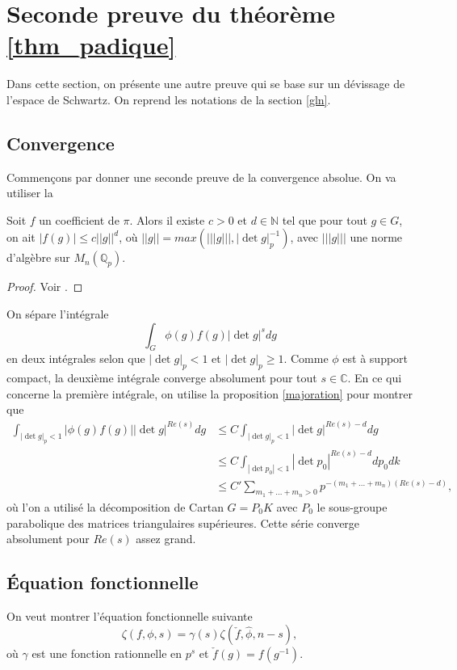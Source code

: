 \section{Seconde preuve du théorème \ref{thm_padique}}

Dans cette section, on présente une autre preuve qui se base sur un dévissage de l'espace de Schwartz. On reprend les notations de la section \ref{gln}. 

\subsection{Convergence}

Commençons par donner une seconde preuve de la convergence absolue. On va utiliser la
\begin{proposition}
\label{majoration}
Soit $f$ un coefficient de $\pi$. Alors il existe $c > 0$ et $d \in \mathbb{N}$ tel que pour tout $g \in G$, on ait $|f(g)| \leq c ||g||^d$, où $||g|| = max(|||g|||, |\det g|_p^{-1})$, avec $|||g|||$ une norme d'algèbre sur $M_n(\mathbb{Q}_p)$.
\end{proposition}

\begin{proof}
Voir \cite[Corollaire I.4.4]{waldspurger}.
\end{proof}

On sépare l'intégrale
\begin{equation}
\int_G \phi(g)f(g)|\det g|^s dg
\end{equation}
en deux intégrales selon que $|\det g|_p < 1$ et $|\det g|_p \geq 1$. Comme $\phi$ est à support compact, la deuxième intégrale converge absolument pour tout $s \in \mathbb{C}$. En ce qui concerne la première intégrale, on utilise la proposition \ref{majoration} pour montrer que
\begin{align}
\int_{|\det g|_p < 1}|\phi(g)f(g)||\det g|^{Re(s)} dg &\leq C \int_{|\det g|_p < 1} |\det g|^{Re(s)-d} dg \\
&\leq C \int_{|\det p_0| < 1} |\det p_0|^{Re(s)-d}dp_0dk \\
&\leq C' \sum_{m_1 + ... + m_n > 0} p^{-(m_1+...+m_n)(Re(s)-d)},
\end{align}
où l'on a utilisé la décomposition de Cartan $G=P_0K$ avec $P_0$ le sous-groupe parabolique des matrices triangulaires supérieures. Cette série converge absolument pour $Re(s)$ assez grand.

\subsection{Équation fonctionnelle}
On veut montrer l'équation fonctionnelle suivante
\begin{equation}
\zeta(f, \phi, s) = \gamma(s) \zeta(\check{f}, \hat{\phi}, n-s),
\end{equation}
où $\gamma$ est une fonction rationnelle en $p^s$ et $\check{f}(g) = f(g^{-1})$.

